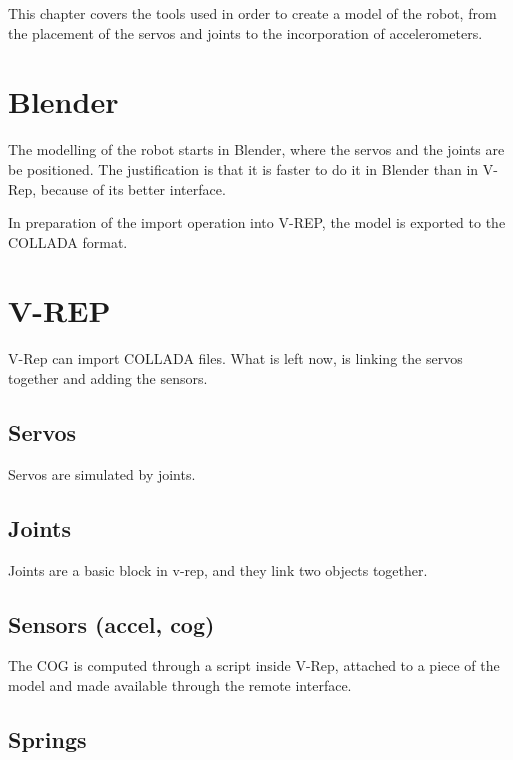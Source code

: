 This chapter covers the tools used in order to create a model of the robot, from the placement of the servos and joints to the incorporation of accelerometers.

\section{Blender}
The modelling of the robot starts in Blender, where the servos and the joints are be positioned. The justification is that it is faster to do it in Blender than in V-Rep, because of its better interface. 

In preparation of the import operation into V-REP, the model is exported to the COLLADA format.

\section{V-REP}
V-Rep can import COLLADA files. What is left now, is linking the servos together and adding the sensors.

\subsection{Servos}
Servos are simulated by joints.

\subsection{Joints}
Joints are a basic block in v-rep, and they link two objects together. 

\subsection{Sensors (accel, cog)}
The COG is computed through a script inside V-Rep, attached to a piece of the model and made available through the remote interface.

\subsection{Springs}